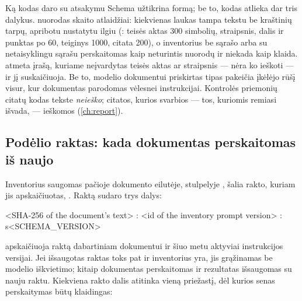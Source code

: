 \begin{codebox}{Ką kodas daro su atsakymu}
Schema užtikrina formą; be to, kodas atlieka dar tris dalykus.  nuorodas
skaito atlaidžiai: kiekvienas laukas tampa tekstu be kraštinių tarpų, apribotu nustatytu ilgiu
(: teisės aktas 300 simbolių, straipsnis, dalis ir punktas po 60, teiginys
1000, citata 200), o inventorius be sąrašo arba su netaisyklingu sąrašu perskaitomas kaip
neturintis nuorodų ir niekada kaip klaida.  atmeta įrašą, kuriame
neįvardytas teisės aktas ar straipsnis --- nėra ko ieškoti --- ir jį suskaičiuoja. Be to,
modelio dokumentui priskirtas tipas pakeičia įkėlėjo rūšį visur, kur dokumentas parodomas
vėlesnei instrukcijai. Kontrolės priemonių citatų kodas tekste \emph{neieško}; citatos, kurios
svarbios --- tos, kuriomis remiasi išvada, --- ieškomos (\cref{ch:report}).
\end{codebox}

\subsection{Podėlio raktas: kada dokumentas perskaitomas iš naujo}\label{sec:company:inventory-cache}

Inventorius saugomas pačioje dokumento eilutėje, stulpelyje , šalia rakto,
kuriam jis apskaičiuotas, . Raktą sudaro trys dalys:

\begin{codeblock}
<SHA-256 of the document's text> : <id of the inventory prompt version> : s<SCHEMA_VERSION>
\end{codeblock}

 apskaičiuoja raktą dabartiniam dokumentui ir šiuo metu aktyviai
instrukcijos versijai. Jei išsaugotas raktas toks pat ir inventorius yra, jis grąžinamas be
modelio iškvietimo; kitaip dokumentas perskaitomas ir rezultatas išsaugomas su nauju raktu.
Kiekviena rakto dalis atitinka vieną priežastį, dėl kurios senas perskaitymas būtų klaidingas:

